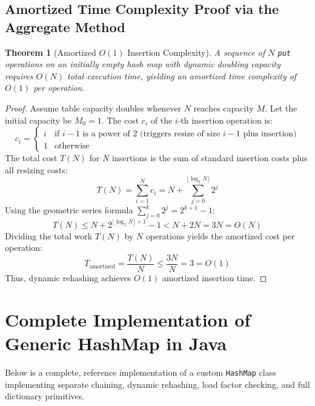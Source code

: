\documentclass[10pt,journal,compsoc,onecolumn]{IEEEtran}
\newtheorem{theorem}{Theorem}
\begin{document}
\subsection{Amortized Time Complexity Proof via the Aggregate Method}

\begin{theorem}[Amortized $O(1)$ Insertion Complexity]
A sequence of $N$ \texttt{put} operations on an initially empty hash map with dynamic doubling capacity requires $O(N)$ total execution time, yielding an amortized time complexity of $O(1)$ per operation.
\end{theorem}
\begin{proof}
Assume table capacity doubles whenever $N$ reaches capacity $M$. Let the initial capacity be $M_0 = 1$. The cost $c_i$ of the $i$-th insertion operation is:
\[
c_i = \begin{cases}
i & \text{if } i - 1 \text{ is a power of 2 (triggers resize of size } i - 1 \text{ plus insertion)} \\
1 & \text{otherwise}
\end{cases}
\]
The total cost $T(N)$ for $N$ insertions is the sum of standard insertion costs plus all resizing costs:
\[
T(N) = \sum_{i=1}^{N} c_i = N + \sum_{j=0}^{\lfloor \log_2 N \rfloor} 2^j
\]
Using the geometric series formula $\sum_{j=0}^{k} 2^j = 2^{k+1} - 1$:
\[
T(N) \le N + 2^{\lfloor \log_2 N \rfloor + 1} - 1 < N + 2N = 3N = O(N)
\]
Dividing the total work $T(N)$ by $N$ operations yields the amortized cost per operation:
\[
T_{\text{amortized}} = \frac{T(N)}{N} \le \frac{3N}{N} = 3 = O(1)
\]
Thus, dynamic rehashing achieves $O(1)$ amortized insertion time.
\end{proof}

\section{Complete Implementation of Generic HashMap in Java}
\label{sec:implementation}

Below is a complete, reference implementation of a custom \texttt{HashMap} class implementing separate chaining, dynamic rehashing, load factor checking, and full dictionary primitives.
\end{document}
